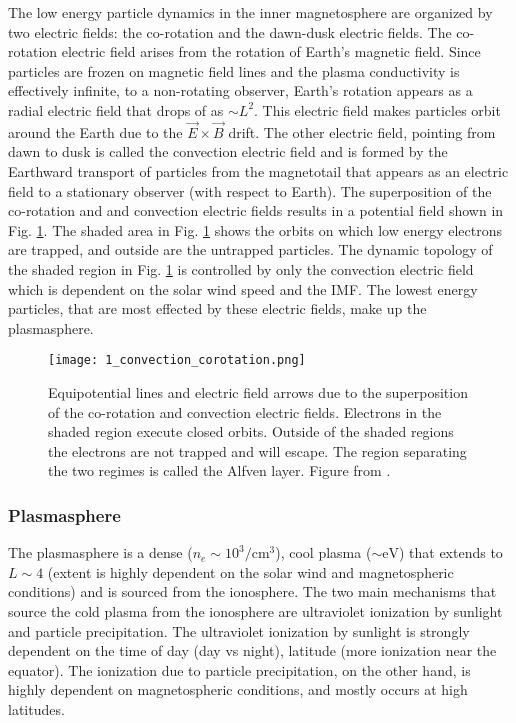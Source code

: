 The low energy particle dynamics in the inner magnetosphere are organized by two electric fields: the co-rotation and the dawn-dusk electric fields. The co-rotation electric field arises from the rotation of Earth's magnetic field. Since particles are frozen on magnetic field lines and the plasma conductivity is effectively infinite, to a non-rotating observer, Earth's rotation appears as a radial electric field that drops of as $\sim L^2$. This electric field makes particles orbit around the Earth due to the $\vec{E} \times \vec{B}$ drift. The other electric field, pointing from dawn to dusk is called the convection electric field and is formed by the Earthward transport of particles from the magnetotail that appears as an electric field to a stationary observer (with respect to Earth). The superposition of the co-rotation and and convection electric fields results in a potential field shown in Fig. \ref{Intro:E_fields}. The shaded area in Fig. \ref{Intro:E_fields} shows the orbits on which low energy electrons are trapped, and outside are the untrapped particles. The dynamic topology of the shaded region in Fig. \ref{Intro:E_fields} is controlled by only the convection electric field which is dependent on the solar wind speed and the IMF. The lowest energy particles, that are most effected by these electric fields, make up the plasmasphere.

\begin{figure}
\texttt{[image: 1\_convection\_corotation.png]}
\caption{Equipotential lines and electric field arrows due to the superposition of the co-rotation and convection electric fields. Electrons in the shaded region execute closed orbits. Outside of the shaded regions the electrons are not trapped and will escape. The region separating the two regimes is called the Alfven layer. Figure from \citet{Baumjohann1997}.}
\label{Intro:E_fields}
\end{figure}

\subsubsection{Plasmasphere}
The plasmasphere is a dense ($n_e \sim 10^3/\mathrm{cm}^3$), cool plasma ($\sim \mathrm{eV}$) that extends to $L \sim 4$ (extent is highly dependent on the solar wind and magnetospheric conditions) and is sourced from the ionosphere. The two main mechanisms that source the cold plasma from the ionosphere are ultraviolet ionization by sunlight and particle precipitation. The ultraviolet ionization by sunlight is strongly dependent on the time of day (day vs night), latitude (more ionization near the equator). The ionization due to particle precipitation, on the other hand, is highly dependent on magnetospheric conditions, and mostly occurs at high latitudes.


